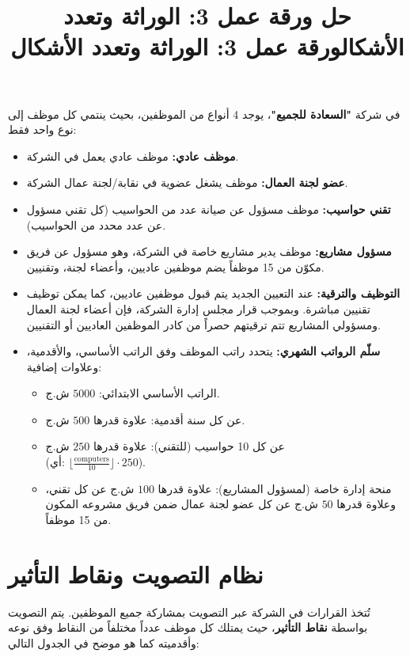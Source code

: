 \documentclass[14pt]{extarticle}
\title{حل ورقة عمل 3: الوراثة وتعدد الأشكال}
\title{ورقة عمل 3: الوراثة وتعدد الأشكال}
\begin{document}
\maketitle
\thispagestyle{fancy}

\begin{boxDef}
في شركة \textbf{"السعادة للجميع"}، يوجد 4 أنواع من الموظفين، بحيث ينتمي كل موظف إلى نوع واحد فقط:
\begin{itemize}
    \item \textbf{موظف عادي:} موظف عادي يعمل في الشركة.
    \item \textbf{عضو لجنة العمال:} موظف يشغل عضوية في نقابة/لجنة عمال الشركة.
    \item \textbf{تقني حواسيب:} موظف مسؤول عن صيانة عدد من الحواسيب (كل تقني مسؤول عن عدد محدد من الحواسيب).
    \item \textbf{مسؤول مشاريع:} موظف يدير مشاريع خاصة في الشركة، وهو مسؤول عن فريق مكوّن من 15 موظفاً يضم موظفين عاديين، وأعضاء لجنة، وتقنيين.
\end{itemize}
\end{boxDef}

\begin{boxNote}
\begin{itemize}
    \item \textbf{التوظيف والترقية:} عند التعيين الجديد يتم قبول موظفين عاديين، كما يمكن توظيف تقنيين مباشرة. وبموجب قرار مجلس إدارة الشركة، فإن أعضاء لجنة العمال ومسؤولي المشاريع تتم ترقيتهم حصراً من كادر الموظفين العاديين أو التقنيين.
    \item \textbf{سلّم الرواتب الشهري:} يتحدد راتب الموظف وفق الراتب الأساسي، والأقدمية، وعلاوات إضافية:
    \begin{itemize}
        \item الراتب الأساسي الابتدائي: $5000$ ش.ج.
        \item عن كل سنة أقدمية: علاوة قدرها $500$ ش.ج.
        \item عن كل 10 حواسيب (للتقني): علاوة قدرها $250$ ش.ج \\ (أي: $\lfloor \frac{\text{computers}}{10} \rfloor \cdot 250$).
        \item منحة إدارة خاصة (لمسؤول المشاريع): علاوة قدرها $100$ ش.ج عن كل تقني، وعلاوة قدرها $50$ ش.ج عن كل عضو لجنة عمال ضمن فريق مشروعه المكون من 15 موظفاً.
    \end{itemize}
\end{itemize}
\end{boxNote}

\section*{نظام التصويت ونقاط التأثير}
تُتخذ القرارات في الشركة عبر التصويت بمشاركة جميع الموظفين. يتم التصويت بواسطة \textbf{نقاط التأثير}، حيث يمتلك كل موظف عدداً مختلفاً من النقاط وفق نوعه وأقدميته كما هو موضح في الجدول التالي:
\end{document}
